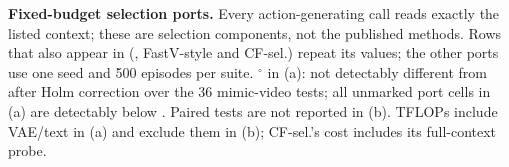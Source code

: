 \begin{table}[t]
  \centering
  \caption{\textbf{Fixed-budget selection ports.}
  Every action-generating call reads exactly the listed context; these are selection components, not the published methods.
  Rows that also appear in  (\method, FastV-style and CF-sel.) repeat its values; the other ports use one seed and 500 episodes per suite.
  $^{\circ}$ in (a): not detectably different from \method after Holm correction over the 36 mimic-video tests; all unmarked port cells in (a) are detectably below \method.
  Paired tests are not reported in (b).
  TFLOPs include VAE/text in (a) and exclude them in (b); CF-sel.'s cost includes its full-context probe.}
  \label{tab:fixed_budget_ports}
  \begin{subtable}[t]{0.49\textwidth}
    \centering
    \caption{mimic-video on LIBERO.}
    \footnotesize
    \setlength{\tabcolsep}{2.5pt}
    \renewcommand{\arraystretch}{1.0}
\end{subtable}
\end{table}
